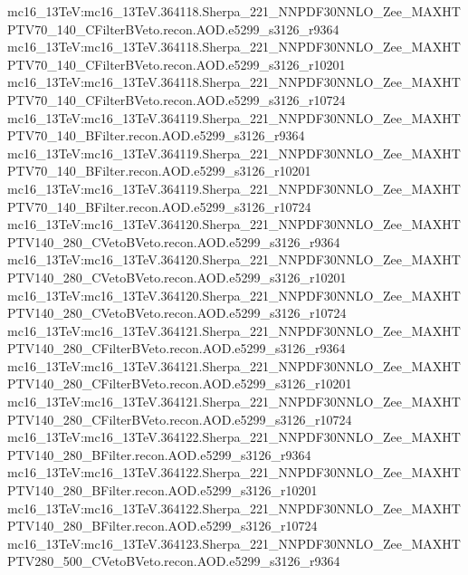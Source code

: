 { mc16\_13TeV:mc16\_13TeV.364118.Sherpa\_221\_NNPDF30NNLO\_Zee\_MAXHTPTV70\_140\_CFilterBVeto.recon.AOD.e5299\_s3126\_r9364 \newline  
 mc16\_13TeV:mc16\_13TeV.364118.Sherpa\_221\_NNPDF30NNLO\_Zee\_MAXHTPTV70\_140\_CFilterBVeto.recon.AOD.e5299\_s3126\_r10201  \newline 
 mc16\_13TeV:mc16\_13TeV.364118.Sherpa\_221\_NNPDF30NNLO\_Zee\_MAXHTPTV70\_140\_CFilterBVeto.recon.AOD.e5299\_s3126\_r10724 \newline  
 mc16\_13TeV:mc16\_13TeV.364119.Sherpa\_221\_NNPDF30NNLO\_Zee\_MAXHTPTV70\_140\_BFilter.recon.AOD.e5299\_s3126\_r9364   \newline
 mc16\_13TeV:mc16\_13TeV.364119.Sherpa\_221\_NNPDF30NNLO\_Zee\_MAXHTPTV70\_140\_BFilter.recon.AOD.e5299\_s3126\_r10201 \newline  
 mc16\_13TeV:mc16\_13TeV.364119.Sherpa\_221\_NNPDF30NNLO\_Zee\_MAXHTPTV70\_140\_BFilter.recon.AOD.e5299\_s3126\_r10724   \newline
 mc16\_13TeV:mc16\_13TeV.364120.Sherpa\_221\_NNPDF30NNLO\_Zee\_MAXHTPTV140\_280\_CVetoBVeto.recon.AOD.e5299\_s3126\_r9364  \newline 
 mc16\_13TeV:mc16\_13TeV.364120.Sherpa\_221\_NNPDF30NNLO\_Zee\_MAXHTPTV140\_280\_CVetoBVeto.recon.AOD.e5299\_s3126\_r10201 \newline
 mc16\_13TeV:mc16\_13TeV.364120.Sherpa\_221\_NNPDF30NNLO\_Zee\_MAXHTPTV140\_280\_CVetoBVeto.recon.AOD.e5299\_s3126\_r10724 \newline  
 mc16\_13TeV:mc16\_13TeV.364121.Sherpa\_221\_NNPDF30NNLO\_Zee\_MAXHTPTV140\_280\_CFilterBVeto.recon.AOD.e5299\_s3126\_r9364  \newline  
 mc16\_13TeV:mc16\_13TeV.364121.Sherpa\_221\_NNPDF30NNLO\_Zee\_MAXHTPTV140\_280\_CFilterBVeto.recon.AOD.e5299\_s3126\_r10201 \newline   
 mc16\_13TeV:mc16\_13TeV.364121.Sherpa\_221\_NNPDF30NNLO\_Zee\_MAXHTPTV140\_280\_CFilterBVeto.recon.AOD.e5299\_s3126\_r10724 \newline  
 mc16\_13TeV:mc16\_13TeV.364122.Sherpa\_221\_NNPDF30NNLO\_Zee\_MAXHTPTV140\_280\_BFilter.recon.AOD.e5299\_s3126\_r9364   \newline  
 mc16\_13TeV:mc16\_13TeV.364122.Sherpa\_221\_NNPDF30NNLO\_Zee\_MAXHTPTV140\_280\_BFilter.recon.AOD.e5299\_s3126\_r10201  \newline   
 mc16\_13TeV:mc16\_13TeV.364122.Sherpa\_221\_NNPDF30NNLO\_Zee\_MAXHTPTV140\_280\_BFilter.recon.AOD.e5299\_s3126\_r10724   \newline  
 mc16\_13TeV:mc16\_13TeV.364123.Sherpa\_221\_NNPDF30NNLO\_Zee\_MAXHTPTV280\_500\_CVetoBVeto.recon.AOD.e5299\_s3126\_r9364  \newline   
}
